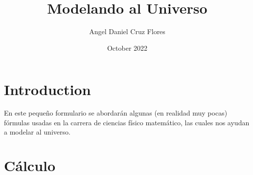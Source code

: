 \documentclass[letterpaper, 12pt]{article}
\title{Modelando al Universo}
\author{Angel Daniel Cruz Flores}
\date{October 2022}
\begin{document}
\maketitle

\section{Introduction}

En este pequeño formulario se abordarán algunas (en realidad muy pocas) fórmulas usadas en la carrera de ciencias físico matemático, las cuales nos ayudan a modelar al universo.

\newpage

\section{Cálculo}
\end{document}
